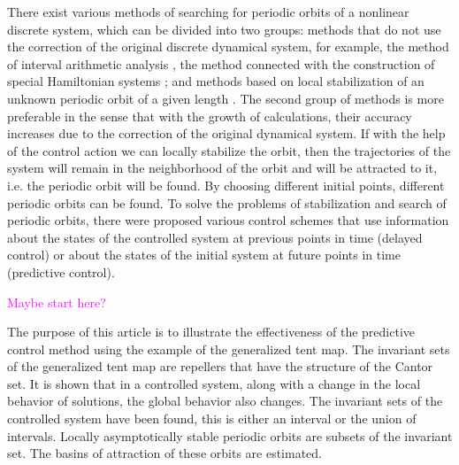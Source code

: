 \documentclass[12pt,a4paper]{amsart}
\begin{document}
There exist various methods of searching for periodic orbits of a nonlinear discrete system, which can be divided into two groups: methods 
that do not use the correction of the original discrete dynamical system, for example, the method of interval arithmetic analysis \cite{Zyg, Gal2002, Gal2001}, 
the method connected with the construction of special Hamiltonian systems \cite{Biham}; and methods based on local stabilization of 
an unknown periodic orbit of a given length \cite{Ott, Qian, Aleks, Yang, Miller, DSLS}. The second group of methods is more preferable in the sense that with the growth 
of calculations, their accuracy increases due to the correction of the original dynamical system. If with the help of the control action we 
can locally stabilize the orbit, then the trajectories of the system will remain in the neighborhood of the orbit and will be attracted to it, 
i.e. the periodic orbit will be found. By choosing different initial points, different periodic orbits can be found. To solve the problems of 
stabilization and search of periodic orbits, there were proposed various control schemes that use information about the states of the controlled 
system at previous points in time \cite{Pyr, Vie, DK, Mor} (delayed control) or about the states of the initial system at future points in time \cite{Polyak, Ushio, Shal, DSI} 
(predictive control). 

\textcolor{magenta}{Maybe start here?}

The purpose of this article is to illustrate the effectiveness of the predictive control method using the example of the generalized tent map. 
The invariant sets of the generalized tent map are repellers that have the structure of the Cantor set. It is shown that in a controlled system, 
along with a change in the local behavior of solutions, the global behavior also changes. The invariant sets of the controlled system have been found, 
this is either an interval or the union of intervals. Locally asymptotically stable periodic orbits are subsets of the invariant set. The basins of 
attraction of these orbits are estimated. 
\end{document}
